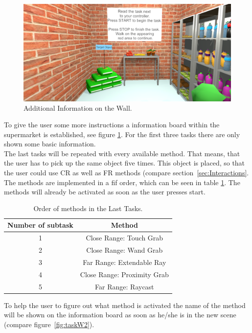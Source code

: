 \begin{figure}[H] 
	\center 
	\includegraphics[width=12cm]{Images/TaskWall_1.PNG}
	\caption[Additional Information on the Wall.]{Additional Information on the Wall.}
	\label{fig:taskW1}
\end{figure}

To give the user some more instructions a information board within the supermarket is established, see figure \ref{fig:taskW1}. For the first three tasks there are only shown some basic information.\\
The last tasks will be repeated with every available method. That means, that the user has to pick up the same object five times. This object is placed, so that the user could use CR as well as FR methods (compare section~\ref{sec:Interactions}. The methods are implemented in a fif order, which can be seen in table \ref{tab: OrderMethods}. The methods will already be activated as soon as the user presses start. \\

\begin{table}[h]
\centering
 \begin{tabular}{|c|c|}
  Number of subtask & Method  \\ \hline
  1 & Close Range: Touch Grab  \\
  2 & Close Range: Wand Grab  \\
  3 & Far Range: Extendable Ray  \\
  4 & Close Range: Proximity Grab  \\
  5 & Far Range: Raycast \\
   \end{tabular}
  \caption[Order of methods in the Last Tasks.]{Order of methods in the Last Tasks.}
	\label{tab: OrderMethods}
 \end{table}

To help the user to figure out what method is activated the name of the method will be shown on the information board as soon as  he/she is in the new scene (compare figure~\ref{fig:taskW2}). 


